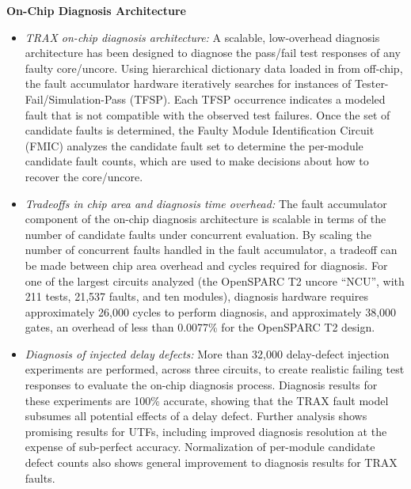 \textbf{On-Chip Diagnosis Architecture}
\begin{itemize}
\item{\textit{TRAX on-chip diagnosis architecture:} A scalable, low-overhead diagnosis architecture has been designed to diagnose the pass/fail test responses of any faulty core/uncore.
%
Using hierarchical dictionary data loaded in from off-chip, the fault accumulator hardware iteratively searches for instances of Tester-Fail/Simulation-Pass (TFSP).
%
Each TFSP occurrence indicates a modeled fault that is not compatible with the observed test failures.
%
Once the set of candidate faults is determined, the Faulty Module Identification Circuit (FMIC) analyzes the candidate fault set to determine the per-module candidate fault counts, which are used to make decisions about how to recover the core/uncore.}
\item{\textit{Tradeoffs in chip area and diagnosis time overhead:} The fault accumulator component of the on-chip diagnosis architecture is scalable in terms of the number of candidate faults under concurrent evaluation.
%
By scaling the number of concurrent faults handled in the fault accumulator, a tradeoff can be made between chip area overhead and cycles required for diagnosis.
%
For one of the largest circuits analyzed (the OpenSPARC T2 uncore ``NCU'', with 211 tests, 21,537 faults, and ten modules), diagnosis hardware requires approximately 26,000 cycles to perform diagnosis, and approximately 38,000 gates, an overhead of less than 0.0077\% for the OpenSPARC T2 design.}
\item{\textit{Diagnosis of injected delay defects:} More than 32,000 delay-defect injection experiments are performed, across three circuits, to create realistic failing test responses to evaluate the on-chip diagnosis process.
%
Diagnosis results for these experiments are 100\% accurate, showing that the TRAX fault model subsumes all potential effects of a delay defect.
%
Further analysis shows promising results for UTFs, including improved diagnosis resolution at the expense of sub-perfect accuracy.
%
Normalization of per-module candidate defect counts also shows general improvement to diagnosis results for TRAX faults.}
\end{itemize}

